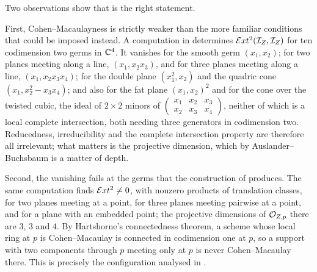 \begin{remark}%
\label{rem:cmsharp}
Two observations show that  is the right statement.

First, Cohen--Macaulayness is strictly weaker than the more familiar
conditions that could be imposed instead. A computation in \cite{BMB26}
determines
$\mathcal{E} xt^{2}(\mathcal{I}_{Z},\mathcal{I}_{Z})$ for ten codimension two germs in $\mathbb{C}^{4}$. It
vanishes for the smooth germ $(x_{1},x_{2})$; for two planes meeting along a
line, $(x_{1},x_{2}x_{3})$, and for three planes meeting along a line,
$(x_{1},x_{2}x_{3}x_{4})$; for the double plane $(x_{1}^{2},x_{2})$ and the
quadric cone $(x_{1},x_{2}^{2}-x_{3}x_{4})$; and also for the fat plane
$(x_{1},x_{2})^{2}$ and for the cone over the twisted cubic, the ideal of
$2\times2$ minors of $\left(\begin{smallmatrix}x_{1}&x_{2}&x_{3}\\
x_{2}&x_{3}&x_{4}\end{smallmatrix}\right)$, neither of which is a local
complete intersection, both needing three generators in codimension two.
Reducedness, irreducibility and the complete intersection property are
therefore all irrelevant; what matters is the projective dimension, which by
Auslander--Buchsbaum is a matter of depth.

Second, the vanishing fails at the germs that the construction of
 produces. The same computation finds
$\mathcal{E} xt^{2}\ne0$, with nonzero products of translation classes, for two planes
meeting at a point, for three planes meeting pairwise at a point, and for a
plane with an embedded point; the projective dimensions of $\mathcal{O}_{Z,p}$ there
are $3$, $3$ and $4$. By Hartshorne's connectedness theorem, a scheme whose local ring at $p$
is Cohen--Macaulay is connected in codimension one at $p$, so a support with
two components through $p$ meeting only at $p$ is never Cohen--Macaulay
there. This is precisely the configuration analysed in
.
\end{remark}

